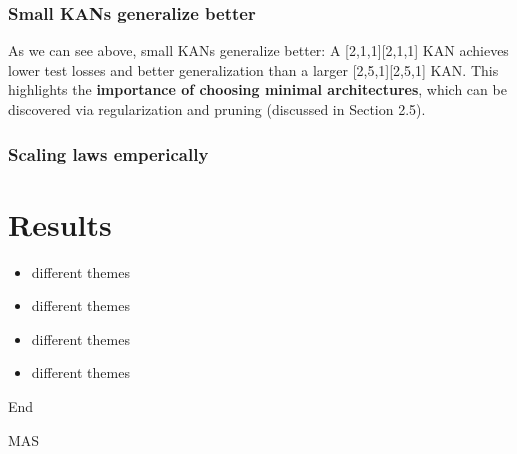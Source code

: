 \documentclass[serif, aspectratio=169]{beamer}
\begin{document}
\begin{frame}
    \frametitle<presentation>{Small KANs generalize better}
    As we can see above, small KANs generalize better: A [2,1,1][2,1,1] KAN achieves lower test losses and better generalization than a larger [2,5,1][2,5,1] KAN. This highlights the \textbf{importance of choosing minimal architectures}, which can be discovered via regularization and pruning (discussed in Section 2.5).
\end{frame}
\begin{frame}
    \frametitle<presentation>{Scaling laws emperically}

\end{frame}
\section{Results}
\begin{frame}
    \begin{itemize}
        \item different themes
        \item different themes
        \item different themes
        \item different themes
    \end{itemize}
\end{frame}


\begin{frame}
    \begin{center}
        {End}
        \vspace{1cm}

        MAS\\[1em]
    \end{center}
\end{frame}
\end{document}
